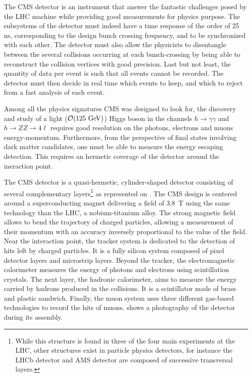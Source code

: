     The CMS detector \cite{CMSdetector} is an instrument that answer the fantastic
    challenges posed by the LHC machine while providing good measurements for physics purpose.
    The subsystems of the detector must indeed have a time response of the order of 25 ns,
    corresponding to the design bunch crossing frequency, and to be synchronized with
    each other. The detector must also allow the physicists to disentangle between the
    several collisions occurring at each bunch-crossing by being able to
    reconstruct the collision vertices with good precision. Last but not least,
    the quantity of data per event is such that all events cannot be recorded. The
    detector must then decide in real time which events to keep, and which to reject
    from a fast analysis of each event.

    Among all the physics signatures CMS was designed to look for, the discovery and study of a
    light ($\mathcal{O}(125 ~\text{GeV})$) Higgs boson in the channels $h\rightarrow\gamma\gamma$
    and $h\rightarrow ZZ \rightarrow 4\ell$ requires good resolution on the photons,
    electrons and muons energy-momentum. Furthermore, from the perspective of final
    states involving dark matter candidates, one must be able to measure
    the energy escaping detection. This requires an hermetic coverage of the detector around
    the ineraction point.


    The CMS detector is a quasi-hermetic, cylinder-shaped detector consisting of
    several complementary layers\footnote{While this structure is found in three of the four
    main experiments at the LHC, other structures exist in particle physics detectors,
    for instance the LHCb detector and AMS detector are composed of successive
    transversal layers.}
    as represented on .
    The CMS design is centered around a superconducting magnet delivering a field of
    3.8~T using the same technology than the LHC, a nobium-titanium alloy. The strong
    magnetic field allows to bend the trajectory of charged particles, allowing a
    measurement of their momentum with an accuracy inversely proportional to the value
    of the field.
    Near the interaction point, the tracker system is dedicated to
    the detection of hits left by charged particles. It is a fully silicon system composed of pixel detector
    layers and microstrip layers. Beyond the tracker, the electromagnetic
    calorimeter measures the energy of photons and electrons using
    scintillation crystals. The next layer, the hadronic calorimeter, aims to measure
    the energy carried by hadrons produced in the collisions. It is a scintillator made
    of brass and plastic sandwich. Finally, the muon system uses three different gas-based
    technologies to record the hits of muons. 
    shows a photography of the detector during its assembly.

